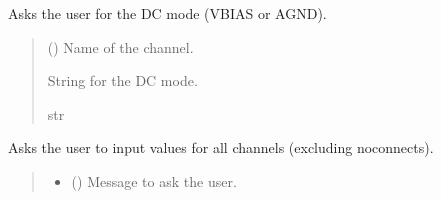 \documentclass[letterpaper,10pt,english]{sphinxmanual}
\begin{document}
\begin{fulllineitems}
\begin{fulllineitems}
\end{fulllineitems}


\begin{fulllineitems}
\label{\detokenize{Setup_8401HR:Setup_8401HR.Setup_8401HR._SetDCMode}}
\pysigstartsignatures
{}
\pysigstopsignatures
\sphinxAtStartPar
Asks the user for the DC mode (VBIAS or AGND).
\begin{quote}\begin{description}
\sphinxAtStartPar
{} () \textendash{} Name of the channel.

\sphinxAtStartPar
String for the DC mode.

\sphinxAtStartPar
str

\end{description}\end{quote}

\end{fulllineitems}


\begin{fulllineitems}
\label{\detokenize{Setup_8401HR:Setup_8401HR.Setup_8401HR._SetForMappedChannels}}
\pysigstartsignatures
{}
\pysigstopsignatures
\sphinxAtStartPar
Asks the user to input values for all channels (excluding no\sphinxhyphen{}connects).
\begin{quote}\begin{description}
\begin{itemize}
\item {} 
\sphinxAtStartPar
{} () \textendash{} Message to ask the user.


\end{itemize}
\end{description}
\end{quote}
\end{fulllineitems}
\end{fulllineitems}
\end{document}

